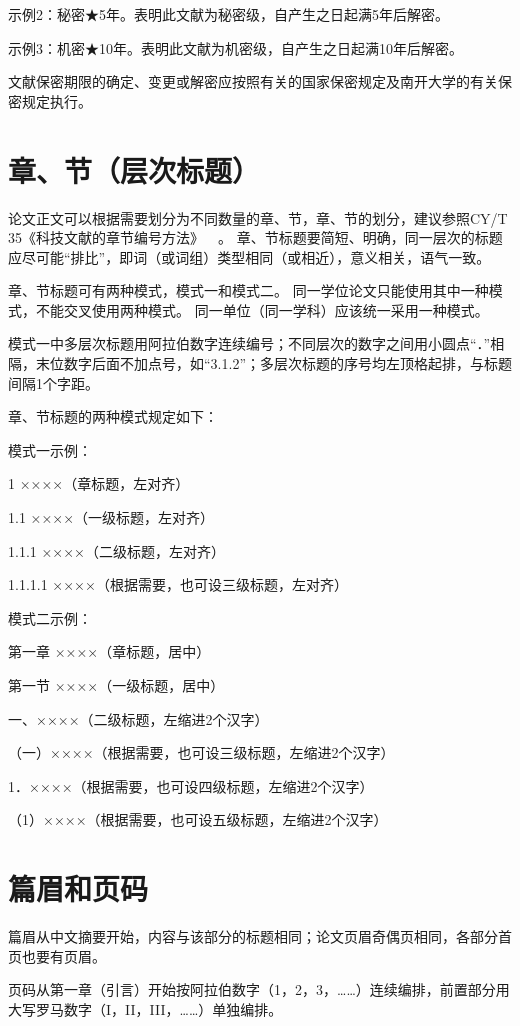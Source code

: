 示例2：秘密★5年。表明此文献为秘密级，自产生之日起满5年后解密。

示例3：机密★10年。表明此文献为机密级，自产生之日起满10年后解密。

文献保密期限的确定、变更或解密应按照有关的国家保密规定及南开大学的有关保密规定执行。

\section{章、节（层次标题）}

论文正文可以根据需要划分为不同数量的章、节，章、节的划分，建议参照CY/T 35《科技文献的章节编号方法》~~\cite{REF00000004}。
章、节标题要简短、明确，同一层次的标题应尽可能“排比”，即词（或词组）类型相同（或相近），意义相关，语气一致。

章、节标题可有两种模式，模式一和模式二。
同一学位论文只能使用其中一种模式，不能交叉使用两种模式。
同一单位（同一学科）应该统一采用一种模式。

模式一中多层次标题用阿拉伯数字连续编号；不同层次的数字之间用小圆点“．”相隔，末位数字后面不加点号，如“3.1.2”；多层次标题的序号均左顶格起排，与标题间隔1个字距。

章、节标题的两种模式规定如下：

模式一示例：

1 ××××（章标题，左对齐）

1.1 ××××（一级标题，左对齐）

1.1.1 ××××（二级标题，左对齐）

1.1.1.1 ××××（根据需要，也可设三级标题，左对齐）

模式二示例：

第一章 ××××（章标题，居中）

第一节 ××××（一级标题，居中）

一、××××（二级标题，左缩进2个汉字）

（一）××××（根据需要，也可设三级标题，左缩进2个汉字）

1．××××（根据需要，也可设四级标题，左缩进2个汉字）

（1）××××（根据需要，也可设五级标题，左缩进2个汉字）

\section{篇眉和页码}

篇眉从中文摘要开始，内容与该部分的标题相同；论文页眉奇偶页相同，各部分首页也要有页眉。

页码从第一章（引言）开始按阿拉伯数字（1，2，3，……）连续编排，前置部分用大写罗马数字（I，II，III，……）单独编排。


